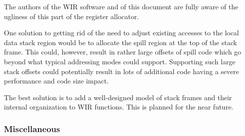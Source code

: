 \begin{wirFutureWork}
The authors of the \gls{WIR} software and of this document are fully aware of the ugliness of this part of the register allocator.

One solution to getting rid of the need to adjust existing accesses to the local data stack region would be to allocate the spill region at the top of the stack frame.
This could, however, result in rather large offsets of spill code which go beyond what typical addressing modes could support.
Supporting such large stack offsets could potentially result in lots of additional code having a severe performance and code size impact.

The best solution is to add a well-designed model of stack frames and their internal organization to \gls{WIR} functions.
This is planned for the near future.
\end{wirFutureWork}


\subsubsection{Miscellaneous}
\label{sssec:misc}

